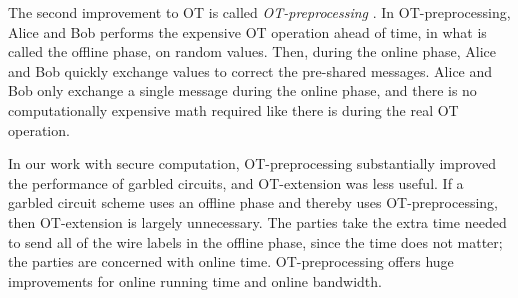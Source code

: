 The second improvement to OT is called \textit{OT-preprocessing} \cite{Bea95}.
In OT-preprocessing, Alice and Bob performs the expensive OT operation ahead of time, in what is called the offline phase, on random values.
Then, during the online phase, Alice and Bob quickly exchange values to correct the pre-shared messages.
Alice and Bob only exchange a single message during the online phase, and there is no computationally expensive math required like there is during the real OT operation.

In our work with secure computation, OT-preprocessing substantially improved the performance of garbled circuits, and OT-extension was less useful.
If a garbled circuit scheme uses an offline phase and thereby uses OT-preprocessing, then OT-extension is largely unnecessary.
The parties take the extra time needed to send all of the wire labels in the offline phase, since the time does not matter; the parties are concerned with online time.
OT-preprocessing offers huge improvements for online running time and online bandwidth.

